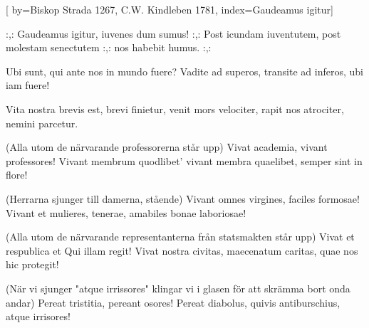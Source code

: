 [
by={Biskop Strada 1267, C.W. Kindleben 1781},
index={Gaudeamus igitur}]

\beginverse*
:,: Gaudeamus igitur,
iuvenes dum sumus! :,:
Post icundam iuventutem,
post molestam senectutem
:,: nos habebit humus. :,:
\endverse	

\beginverse*
Ubi sunt, qui ante nos
in mundo fuere?
Vadite ad superos,
transite ad inferos,
ubi iam fuere!
\endverse	

\beginverse*
Vita nostra brevis est,
brevi finietur,
venit mors velociter,
rapit nos atrociter,
nemini parcetur.
\endverse	

\beginverse*
(Alla utom de närvarande professorerna står upp)
Vivat academia,
vivant professores!
Vivant membrum quodlibet'
vivant membra quaelibet,
semper sint in flore!
\endverse	

\beginverse*
(Herrarna sjunger till damerna, stående)
Vivant omnes virgines,
faciles formosae!
Vivant et mulieres,
tenerae, amabiles
bonae laboriosae!
\endverse	

\beginverse*
(Alla utom de närvarande representanterna från statsmakten står upp)
Vivat et respublica
et Qui illam regit!
Vivat nostra civitas,
maecenatum caritas,
quae nos hic protegit!
\endverse	

\beginverse*
(När vi sjunger "atque irrissores" klingar vi i glasen för att skrämma bort onda andar)
Pereat tristitia,
pereant osores!
Pereat diabolus,
quivis antiburschius,
atque irrisores!
\endverse	

\vspace{1cm}
\endsong


